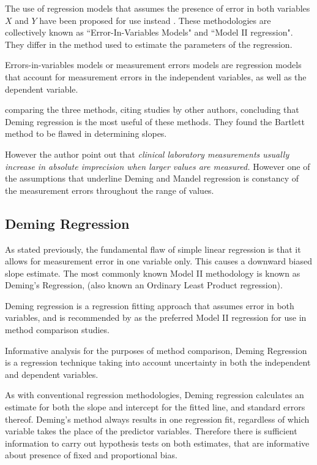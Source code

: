 \documentclass[12pt, a4paper]{report}
\theoremstyle{plain}
\theoremstyle{definition}
\theoremstyle{remark}
\begin{document}
	The use of regression models that assumes the presence of error in
	both variables $X$ and $Y$ have been proposed for use instead
	\citep{CornCoch,ludbrook97}. These methodologies are collectively
	known as ``Error-In-Variables Models" and ``Model II regression". They differ in the method used to
	estimate the parameters of the regression.
	
	Errors-in-variables models or measurement errors models are regression models that account for measurement errors in the independent variables, as well as the dependent variable.
	
	

	
	\citet{CornCoch} comparing the three methods, citing studies by other authors, concluding that Deming regression is the most useful of these methods. They found the Bartlett method to be
	flawed in determining slopes.
	
	However the author point out that \emph{ clinical laboratory measurements usually increase in absolute imprecision when larger values are measured.} However one of the assumptions that underline Deming and Mandel regression is constancy of the measurement errors throughout the range of values.
	
	
	
	
	
	\subsection{Deming Regression}
		
		As stated previously, the fundamental flaw of simple linear regression is that it allows for measurement error in one variable only. This causes a downward biased slope estimate.
		The most commonly known Model II methodology is known as Deming's Regression, (also known an Ordinary Least Product regression). 	
		
		Deming regression is a regression fitting approach that assumes error in both variables, and is recommended by \citet*{CornCoch} as the preferred Model II regression for use in method comparison studies. 
		
	Informative analysis for the purposes of method comparison, Deming Regression is a regression technique taking into account uncertainty in both the independent and dependent variables.
	
	
	As with conventional regression methodologies, Deming regression calculates an estimate for both the slope and intercept for the
	fitted line, and standard errors thereof. Deming’s method always results in one regression fit, regardless of which variable takes the place of the predictor variables. Therefore there is sufficient information to carry out hypothesis tests on both
	estimates, that are informative about presence of fixed and proportional bias.
	
\end{document}
